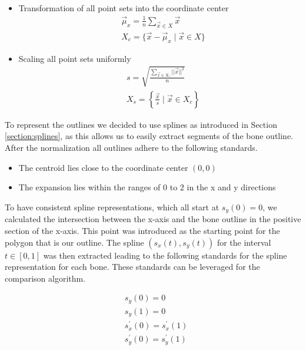 \documentclass[pdftex,12pt,a4paper]{report}
\begin{document}
\begin{itemize}
	\item Transformation of all point sets into the coordinate center
	\begin{equation}
		\begin{split}
			& \vec{\mu}_x = \frac{1}{n} \sum_{\vec{x} \in X} \vec{x} \\
			& X_c = \{ \vec{x} - \vec{\mu}_x \mid \vec{x} \in X \}
		\end{split} 
	\end{equation}
	\item Scaling all point sets uniformly
	\begin{equation}
		\begin{split}
			& s = \sqrt{\frac{\sum\limits_{\vec{x} \in X_c}||\vec{x}||^2}{n}} \\
			& X_s = \left\{ \frac{\vec{x}}{s} \mid \vec{x} \in X_c \right\}
		\end{split}
	\end{equation}
\end{itemize}

To represent the outlines we decided to use splines as introduced in Section \ref{section:splines},
as this allows us to easily extract segments of the bone outline. After the normalization all outlines
adhere to the following standards.

\begin{itemize}
	\item The centroid lies close to the coordinate center $(0,0)$
	\item The expansion lies within the ranges of $0$ to $2$ in the x and y directions
\end{itemize}

To have consistent spline representations, which all start at $s_y(0) = 0$, we calculated the intersection between the x-axis and the bone outline
in the positive section of the x-axis. This point was introduced as the starting point for the polygon that is our outline.
The spline $(s_x(t), s_y(t))$ for the interval $t \in [0, 1]$ was then extracted leading to the
following standards for the spline representation for each bone. These standards can be leveraged for the comparison algorithm.

\begin{equation}
\begin{split}
& s_y(0) = 0 \\
& s_y(1) = 0 \\
& s_x^\prime(0) = s_x^\prime(1) \\
& s_y^\prime(0) = s_y^\prime(1)
\end{split}
\end{equation}
\end{document}
